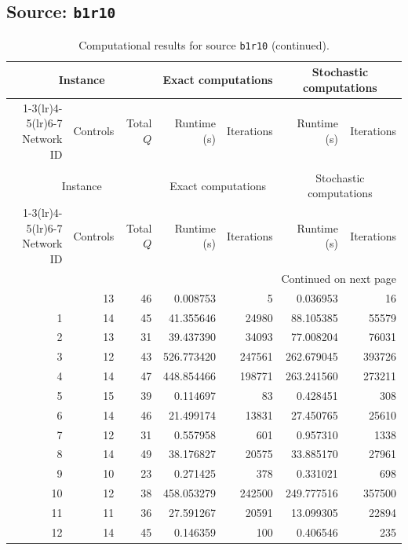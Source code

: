 \documentclass{article}
\begin{document}
\begin{landscape}
\subsection*{Source: \texttt{b1r10}}

\begin{longtable}{rrrrrrr}
\caption{Computational results for source \texttt{b1r10}.}\\
\toprule
\multicolumn{3}{c}{Instance} & \multicolumn{2}{c}{Exact computations} & \multicolumn{2}{c}{Stochastic computations} \\
\cmidrule(lr){1-3}\cmidrule(lr){4-5}\cmidrule(lr){6-7}
Network ID & Controls & Total $Q$ & Runtime (s) & Iterations & Runtime (s) & Iterations \\
\midrule
\endfirsthead
\caption[]{Computational results for source \texttt{b1r10} (continued).}\\
\toprule
\multicolumn{3}{c}{Instance} & \multicolumn{2}{c}{Exact computations} & \multicolumn{2}{c}{Stochastic computations} \\
\cmidrule(lr){1-3}\cmidrule(lr){4-5}\cmidrule(lr){6-7}
Network ID & Controls & Total $Q$ & Runtime (s) & Iterations & Runtime (s) & Iterations \\
\midrule
\endhead
\midrule
\multicolumn{7}{r}{Continued on next page} \\
\endfoot
\bottomrule
\endlastfoot
0 & 13 & 46 & 0.008753 & 5 & 0.036953 & 16 \\
1 & 14 & 45 & 41.355646 & 24980 & 88.105385 & 55579 \\
2 & 13 & 31 & 39.437390 & 34093 & 77.008204 & 76031 \\
3 & 12 & 43 & 526.773420 & 247561 & 262.679045 & 393726 \\
4 & 14 & 47 & 448.854466 & 198771 & 263.241560 & 273211 \\
5 & 15 & 39 & 0.114697 & 83 & 0.428451 & 308 \\
6 & 14 & 46 & 21.499174 & 13831 & 27.450765 & 25610 \\
7 & 12 & 31 & 0.557958 & 601 & 0.957310 & 1338 \\
8 & 14 & 49 & 38.176827 & 20575 & 33.885170 & 27961 \\
9 & 10 & 23 & 0.271425 & 378 & 0.331021 & 698 \\
10 & 12 & 38 & 458.053279 & 242500 & 249.777516 & 357500 \\
11 & 11 & 36 & 27.591267 & 20591 & 13.099305 & 22894 \\
12 & 14 & 45 & 0.146359 & 100 & 0.406546 & 235 \\

\end{longtable}
\end{landscape}
\end{document}
